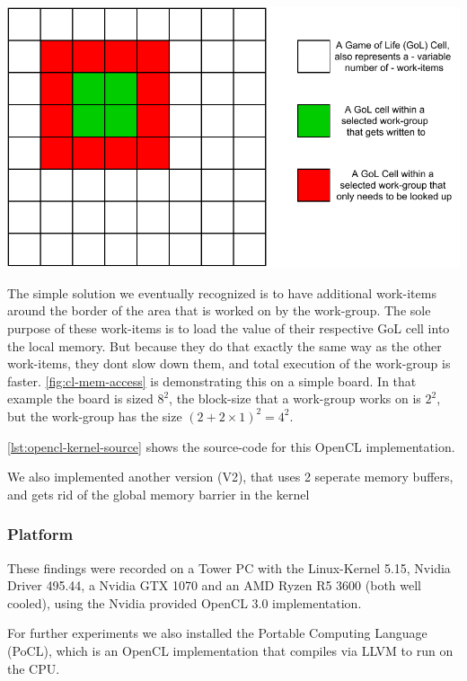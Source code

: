 \documentclass[a4paper,english,12pt,twoside=false]{scrartcl} %
\begin{document}
\begin{center}
    \label{fig:cl-mem-access}
    \includegraphics[width=\linewidth]{imgs/opencl_mem_access.drawio.pdf}
\end{center}

The simple solution we eventually recognized is to have additional work-items around the border of the area that is worked on by the work-group.
The sole purpose of these work-items is to load the value of their respective GoL cell into the local memory. 
But because they do that exactly the same way as the other work-items, they dont slow down them, and total execution of the work-group is faster.
\autoref{fig:cl-mem-access} is demonstrating this on a simple board. 
In that example the board is sized $8^2$, the block-size that a work-group works on is $2^2$, but the work-group has the size $(2 + 2\times 1)^2 = 4^2$.

\autoref{lst:opencl-kernel-source} shows the source-code for this OpenCL implementation.

We also implemented another version (V2), that uses 2 seperate memory buffers, and gets rid of the global memory barrier in the kernel

\subsubsection{Platform}

These findings were recorded on a Tower PC with the Linux-Kernel 5.15, Nvidia Driver 495.44, a Nvidia GTX 1070 and an AMD Ryzen R5 3600 (both well cooled), using the Nvidia provided OpenCL 3.0 implementation.

For further experiments we also installed the Portable Computing Language (PoCL), which is an OpenCL implementation that compiles via LLVM to run on the CPU.
\end{document}
